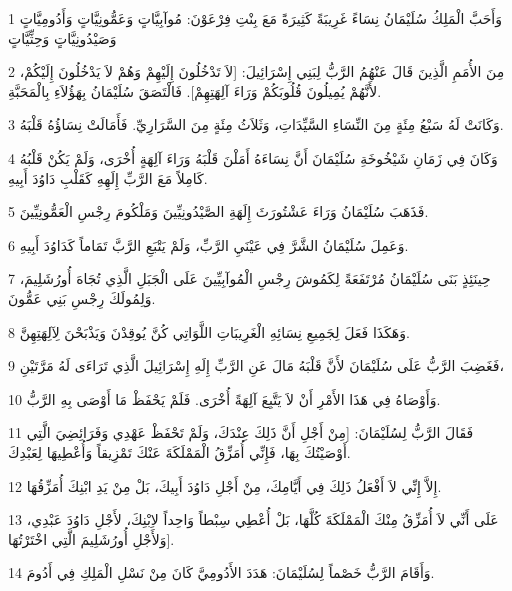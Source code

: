 \par 1 وَأَحَبَّ الْمَلِكُ سُلَيْمَانُ نِسَاءً غَرِيبَةً كَثِيرَةً مَعَ بِنْتِ فِرْعَوْنَ: مُوآبِيَّاتٍ وَعَمُّونِيَّاتٍ وَأَدُومِيَّاتٍ وَصَيْدُونِيَّاتٍ وَحِثِّيَّاتٍ
\par 2 مِنَ الأُمَمِ الَّذِينَ قَالَ عَنْهُمُ الرَّبُّ لِبَنِي إِسْرَائِيلَ: [لاَ تَدْخُلُونَ إِلَيْهِمْ وَهُمْ لاَ يَدْخُلُونَ إِلَيْكُمْ، لأَنَّهُمْ يُمِيلُونَ قُلُوبَكُمْ وَرَاءَ آلِهَتِهِمْ]. فَالْتَصَقَ سُلَيْمَانُ بِهَؤُلاَءِ بِالْمَحَبَّةِ.
\par 3 وَكَانَتْ لَهُ سَبْعُ مِئَةٍ مِنَ النِّسَاءِ السَّيِّدَاتِ، وَثَلاَثُ مِئَةٍ مِنَ السَّرَارِيِّ. فَأَمَالَتْ نِسَاؤُهُ قَلْبَهُ.
\par 4 وَكَانَ فِي زَمَانِ شَيْخُوخَةِ سُلَيْمَانَ أَنَّ نِسَاءَهُ أَمَلْنَ قَلْبَهُ وَرَاءَ آلِهَةٍ أُخْرَى، وَلَمْ يَكُنْ قَلْبُهُ كَامِلاً مَعَ الرَّبِّ إِلَهِهِ كَقَلْبِ دَاوُدَ أَبِيهِ.
\par 5 فَذَهَبَ سُلَيْمَانُ وَرَاءَ عَشْتُورَثَ إِلَهَةِ الصَّيْدُونِيِّينَ وَمَلْكُومَ رِجْسِ الْعَمُّونِيِّينَ.
\par 6 وَعَمِلَ سُلَيْمَانُ الشَّرَّ فِي عَيْنَيِ الرَّبِّ، وَلَمْ يَتْبَعِ الرَّبَّ تَمَاماً كَدَاوُدَ أَبِيهِ.
\par 7 حِينَئِذٍ بَنَى سُلَيْمَانُ مُرْتَفَعَةً لِكَمُوشَ رِجْسِ الْمُوآبِيِّينَ عَلَى الْجَبَلِ الَّذِي تُجَاهَ أُورُشَلِيمَ، وَلِمُولَكَ رِجْسِ بَنِي عَمُّونَ.
\par 8 وَهَكَذَا فَعَلَ لِجَمِيعِ نِسَائِهِ الْغَرِيبَاتِ اللَّوَاتِي كُنَّ يُوقِدْنَ وَيَذْبَحْنَ لِآلِهَتِهِنَّ.
\par 9 فَغَضِبَ الرَّبُّ عَلَى سُلَيْمَانَ لأَنَّ قَلْبَهُ مَالَ عَنِ الرَّبِّ إِلَهِ إِسْرَائِيلَ الَّذِي تَرَاءَى لَهُ مَرَّتَيْنِ،
\par 10 وَأَوْصَاهُ فِي هَذَا الأَمْرِ أَنْ لاَ يَتَّبِعَ آلِهَةً أُخْرَى. فَلَمْ يَحْفَظْ مَا أَوْصَى بِهِ الرَّبُّ.
\par 11 فَقَالَ الرَّبُّ لِسُلَيْمَانَ: [مِنْ أَجْلِ أَنَّ ذَلِكَ عِنْدَكَ، وَلَمْ تَحْفَظْ عَهْدِي وَفَرَائِضِيَ الَّتِي أَوْصَيْتُكَ بِهَا، فَإِنِّي أُمَزِّقُ الْمَمْلَكَةَ عَنْكَ تَمْزِيقاً وَأُعْطِيهَا لِعَبْدِكَ.
\par 12 إِلاَّ إِنِّي لاَ أَفْعَلُ ذَلِكَ فِي أَيَّامِكَ، مِنْ أَجْلِ دَاوُدَ أَبِيكَ، بَلْ مِنْ يَدِ ابْنِكَ أُمَزِّقُهَا.
\par 13 عَلَى أَنِّي لاَ أُمَزِّقُ مِنْكَ الْمَمْلَكَةَ كُلَّهَا، بَلْ أُعْطِي سِبْطاً وَاحِداً لاِبْنِكَ، لأَجْلِ دَاوُدَ عَبْدِي، وَلأَجْلِ أُورُشَلِيمَ الَّتِي اخْتَرْتُهَا].
\par 14 وَأَقَامَ الرَّبُّ خَصْماً لِسُلَيْمَانَ: هَدَدَ الأَدُومِيَّ كَانَ مِنْ نَسْلِ الْمَلِكِ فِي أَدُومَ.
